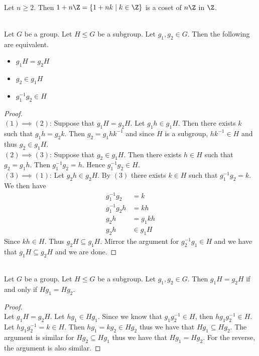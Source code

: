 \documentclass[a4paper]{article}
\begin{document}
\begin{eg}{}{}\\
Let $n\geq 2$. Then $1+n\Z=\{1+nk\;|\;k\in\Z\}$ is a coset of $n\Z$ in $\Z$. 
\end{eg}

\begin{prp}{}{}\\
Let $G$ be a group. Let $H\leq G$ be a subgroup. Let $g_1,g_2\in G$. Then the following are equivalent. 
\begin{itemize}
\item $g_1H=g_2H$
\item $g_2\in g_1H$
\item $g_1^{-1}g_2\in H$
\end{itemize}
\begin{proof}\\
$(1)\implies(2)$: Suppose that $g_1H=g_2H$. Let $g_1h\in g_1H$. Then there exists $k$ such that $g_1h=g_2k$. Then $g_2=g_1hk^{-1}$ and since $H$ is a subgroup, $hk^{-1}\in H$ and thus $g_2\in g_1H$. \\

$(2)\implies(3)$: Suppose that $g_2\in g_1H$. Then there exists $h\in H$ such that $g_2=g_1h$. Then $g_1^{-1}g_2=h$. Hence $g_1^{-1}g_2\in H$. \\

$(3)\implies(1)$: Let $g_2h\in g_2H$. By $(3)$ there exists $k\in H$ such that $g_1^{-1}g_2=k$. We then have 
\begin{align*}
g_1^{-1}g_2&=k\\
g_1^{-1}g_2h&=kh\\
g_2h&=g_1kh\\
g_2h&\in g_1H
\end{align*} Since $kh\in H$. Thus $g_2H\subseteq g_1H$. Mirror the argument for $g_2^{-1}g_1\in H$ and we have that $g_1H\subseteq g_2H$ and we are done. 
\end{proof}
\end{prp}

\begin{prp}{}{}\\
Let $G$ be a group. Let $H\leq G$ be a subgroup. Let $g_1,g_2\in G$. Then $g_1H=g_2H$ if and only if $Hg_1=Hg_2$. 
\begin{proof}\\
Let $g_1H=g_2H$. Let $hg_1\in Hg_1$. Since we know that $g_1g_2^{-1}\in H$, then $hg_1g_2^{-1}\in H$. Let $hg_1g_2^{-1}=k\in H$. Then $hg_1=kg_2\in Hg_2$ thus we have that $Hg_1\subseteq Hg_2$. The argument is similar for $Hg_2\subseteq Hg_1$ thus we have that $Hg_1=Hg_2$. For the reverse, the argument is also similar. 
\end{proof}
\end{prp}
\end{document}

